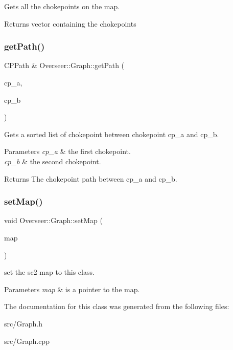 Gets all the chokepoints on the map. 

\begin{DoxyReturn}{Returns}
vector containing the chokepoints 
\end{DoxyReturn}
\mbox{\label{classOverseer_1_1Graph_a3e1625adca63c0446193612b1a0e41e7}} 
\subsubsection{\texorpdfstring{get\+Path()}{getPath()}}
{\footnotesize\ttfamily C\+P\+Path \& Overseer\+::\+Graph\+::get\+Path (\begin{DoxyParamCaption}\item[{\hyperlink{classOverseer_1_1ChokePoint}{Choke\+Point}}]{cp\+\_\+a,  }\item[{\hyperlink{classOverseer_1_1ChokePoint}{Choke\+Point}}]{cp\+\_\+b }\end{DoxyParamCaption})}



Gets a sorted list of chokepoint between chokepoint cp\+\_\+a and cp\+\_\+b. 


\begin{DoxyParams}{Parameters}
{\em cp\+\_\+a} & the first chokepoint. \\
\hline
{\em cp\+\_\+b} & the second chokepoint. \\
\hline
\end{DoxyParams}
\begin{DoxyReturn}{Returns}
The chokepoint path between cp\+\_\+a and cp\+\_\+b. 
\end{DoxyReturn}
\mbox{\label{classOverseer_1_1Graph_ad515783d1196207bc2c34637f421b593}} 
\subsubsection{\texorpdfstring{set\+Map()}{setMap()}}
{\footnotesize\ttfamily void Overseer\+::\+Graph\+::set\+Map (\begin{DoxyParamCaption}\item[{\hyperlink{classOverseer_1_1Map}{Map} $\ast$}]{map }\end{DoxyParamCaption})}



set the sc2 map to this class. 


\begin{DoxyParams}{Parameters}
{\em map} & is a pointer to the map. \\
\hline
\end{DoxyParams}


The documentation for this class was generated from the following files\+:\begin{DoxyCompactItemize}
\item 
src/Graph.\+h\item 
src/Graph.\+cpp\end{DoxyCompactItemize}
